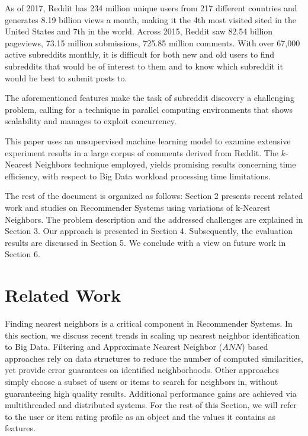 \documentclass[conference, 12pt]{IEEEtran}
\begin{document}
As of 2017, Reddit has 234 million unique users from 217 different countries and generates 8.19 billion views a month, making it the 4th most visited sited in the United States and 7th in the world. Across 2015, Reddit saw 82.54 billion pageviews, 73.15 million submissions, 725.85 million comments. With over 67,000 active subreddits monthly, it is difficult for both new and old users to find subreddits that would be of interest to them and to know which subreddit it would be best to submit posts to. 

The aforementioned features make the task of subreddit discovery a challenging problem, calling for a technique in parallel computing environments that shows scalability and manages to exploit concurrency.

This paper uses an unsupervised machine learning model to examine extensive experiment results in a large corpus of comments derived from Reddit. The $k$-Nearest Neighbors technique employed, yields promising results concerning time efficiency, with respect to Big Data workload processing time limitations.

The rest of the document is organized as follows: Section 2 presents recent related work and studies on
Recommender Systems using variations of k-Nearest Neighbors. The problem description and the addressed challenges are explained in Section 3. Our approach is presented in Section 4. Subsequently, the evaluation results
are discussed in Section 5. We conclude with a view on future work in Section 6.
  

\section{Related Work}
 Finding nearest neighbors is a critical component in Recommender Systems. In this section, we discuss recent trends in scaling up nearest neighbor identification to Big Data. Filtering and Approximate Nearest Neighbor ($ANN$) based approaches rely on data structures to reduce the number of computed similarities, yet provide error guarantees on identified neighborhoods. Other approaches simply choose a subset of users or items to search for neighbors in, without guaranteeing high quality results. Additional performance gains are achieved via multithreaded and distributed systems. For the rest of this Section, we will refer to the user or item rating profile as an object and the values it contains as features.
\end{document}
